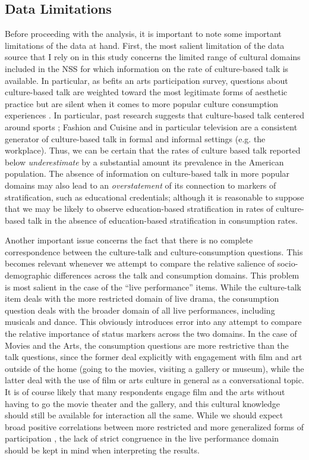 \subsection{Data Limitations}
Before proceeding with the analysis, it is important to note some important limitations of the data at hand.  First, the most salient limitation of the data source that I rely on in this study concerns the limited range of cultural domains included in the NSS for which information on the rate of culture-based talk is available.  In particular, as befits an arts participation survey, questions about culture-based talk are weighted toward the most legitimate forms of aesthetic practice but are silent when it comes to more popular culture consumption experiences \citep{dimaggio_mukhtar04}. In particular, past research suggests that culture-based talk centered around sports \citep{erickson96}; Fashion and Cuisine \citep{dimaggio87} and in particular television \citep{fiske87} are a consistent generator of culture-based talk in formal  and informal settings (e.g. the workplace).  Thus, we can be certain that the rates of culture based talk reported below \emph{underestimate} by a substantial amount its prevalence in the American population.   The absence of information on culture-based talk in more popular domains may also lead to an \emph{overstatement} of its connection to markers of stratification, such as educational credentials; although it is reasonable to suppose that we may be likely to observe education-based stratification in rates of culture-based talk in the absence of education-based stratification in consumption rates.  

Another important issue concerns the fact that there is no complete correspondence between the culture-talk and culture-consumption questions.  This becomes relevant whenever we attempt to compare the relative salience of socio-demographic differences across the talk and consumption domains.  This problem is most salient in the case of the ``live performance'' items.  While the culture-talk item deals with the more restricted domain of live drama, the consumption question deals with the broader domain of all live performances, including musicals and dance.  This obviously introduces error into any attempt to compare the relative importance of status markers across the two domains.  In the case of Movies and the Arts, the consumption questions are more restrictive than the talk questions, since the former deal explicitly with engagement with film and art outside of the home (going to the movies, visiting a gallery or museum), while the latter deal with the use of film or arts culture in general as a conversational topic.  It is of course likely that many respondents engage film and the arts without having to go the movie theater and the gallery, and this cultural knowledge should still be available for interaction all the same.  While we should expect broad positive correlations between more restricted and more generalized forms of participation \citep{dimaggio_useem78a, sullivan_katzgerro07}, the lack of strict congruence in the live performance domain should be kept in mind when interpreting the results. 

